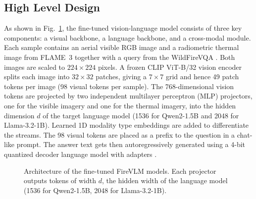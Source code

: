 \documentclass[conference]{IEEEtran}
\begin{document}
\subsection{High Level Design}

As shown in Fig.~\ref{fig:pipeline}, the fine-tuned vision-language model consists of three key components: a visual backbone, a language backbone, and a cross-modal module. Each sample contains an aerial visible RGB image and a radiometric thermal image from FLAME~3 together with a query from the WildFireVQA \cite{wildfirevqa,flame3}. Both images are scaled to $224\times224$ pixels. A frozen CLIP ViT-B/32 vision encoder \cite{radford2021} splits each image into $32\times32$ patches, giving a $7\times7$ grid and hence 49 patch tokens per image (98 visual tokens per sample). The 768-dimensional vision tokens are projected by two independent multilayer perceptron (MLP) projectors, one for the visible imagery and one for the thermal imagery, into the hidden dimension $d$ of the target language model (1536 for Qwen2-1.5B and 2048 for Llama-3.2-1B). Learned 1D modality type embeddings are added to differentiate the streams. The 98 visual tokens are placed as a prefix to the question in a chat-like prompt. The answer text gets then autoregressively generated using a 4-bit quantized decoder language model with adapters \cite{dettmers2023,hu2022}.

\begin{figure}[!t]
  \centering
  \caption{Architecture of the fine-tuned FireVLM models. Each projector outputs tokens of width $d$, the hidden width of the language model (1536 for Qwen2-1.5B, 2048 for Llama-3.2-1B).}
  \label{fig:pipeline}
\end{figure}
\end{document}
